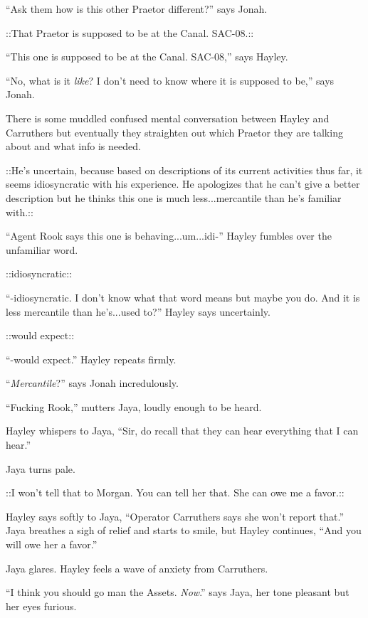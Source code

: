 ``Ask them how is this other Praetor different?'' says Jonah.

 {\color[RGB]{153,0,255}::That Praetor is supposed to be at the Canal.  SAC-08.::} 

``This one is supposed to be at the Canal.  SAC-08,'' says Hayley.

``No, what is it \textit{like}?  I don't need to know where it is supposed to be,'' says Jonah.

There is some muddled confused mental conversation between Hayley and Carruthers but eventually they straighten out which Praetor they are talking about and what info is needed.

 {\color[RGB]{153,0,255}::He's uncertain, because based on descriptions of its current activities thus far, it seems idiosyncratic with his experience.  He apologizes that he can't give a better description but he thinks this one is much less...mercantile than he's familiar with.::} 

``Agent Rook says this one is behaving...um...idi-'' Hayley fumbles over the unfamiliar word.

 {\color[RGB]{153,0,255}::idiosyncratic::} 

``-idiosyncratic.  I don't know what that word means but maybe you do.  And it is less mercantile than he's...used to?'' Hayley says uncertainly.

 {\color[RGB]{153,0,255}::would expect::} 

``-would expect.'' Hayley repeats firmly.

``\textit{Mercantile}?'' says Jonah incredulously.

``Fucking Rook,'' mutters Jaya, loudly enough to be heard. 

Hayley whispers to Jaya, ``Sir, do recall that they can hear everything that I can hear.''

Jaya turns pale.

 {\color[RGB]{153,0,255}::I won't tell that to Morgan.  You can tell her that.  She can owe me a favor.::} 

Hayley says softly to Jaya, ``Operator Carruthers says she won't report that.''  Jaya breathes a sigh of relief and starts to smile, but Hayley continues, ``And you will owe her a favor.''

Jaya glares.  Hayley feels a wave of anxiety from Carruthers.

``I think you should go man the Assets.  \textit{Now}.'' says Jaya, her tone pleasant but her eyes furious.

